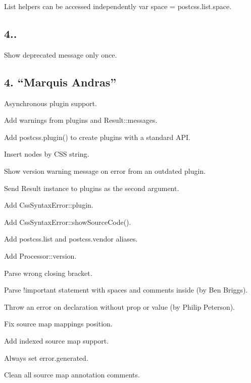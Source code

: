 \begin{DoxyItemize}
\item List helpers can be accessed independently {\ttfamily var space = postcss.\+list.\+space}.
\end{DoxyItemize}

\subsection*{4..}


\begin{DoxyItemize}
\item Show deprecated message only once.
\end{DoxyItemize}

\subsection*{4. “\+Marquis Andras”}


\begin{DoxyItemize}
\item Asynchronous plugin support.
\item Add warnings from plugins and {\ttfamily Result\+::messages}.
\item Add {\ttfamily postcss.\+plugin()} to create plugins with a standard A\+PI.
\item Insert nodes by C\+SS string.
\item Show version warning message on error from an outdated plugin.
\item Send {\ttfamily Result} instance to plugins as the second argument.
\item Add {\ttfamily Css\+Syntax\+Error\+::plugin}.
\item Add {\ttfamily Css\+Syntax\+Error\+::show\+Source\+Code()}.
\item Add {\ttfamily postcss.\+list} and {\ttfamily postcss.\+vendor} aliases.
\item Add {\ttfamily Processor\+::version}.
\item Parse wrong closing bracket.
\item Parse {\ttfamily !important} statement with spaces and comments inside (by Ben Briggs).
\item Throw an error on declaration without {\ttfamily prop} or {\ttfamily value} (by Philip Peterson).
\item Fix source map mappings position.
\item Add indexed source map support.
\item Always set {\ttfamily error.\+generated}.
\item Clean all source map annotation comments.
\end{DoxyItemize}

